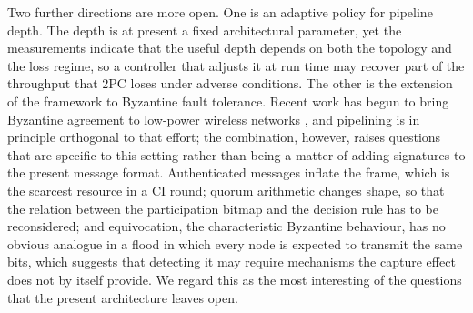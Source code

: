 \documentclass[journal]{IEEEtran}
\newcommand{\CI}{CI}                      %
\begin{document}
Two further directions are more open. One is an adaptive policy for
pipeline depth. The depth is at present a fixed architectural parameter,
yet the measurements indicate that the useful depth depends on both the
topology and the loss regime, so a controller that adjusts it at run time
may recover part of the throughput that 2PC loses under adverse
conditions. The other is the extension of the framework to Byzantine
fault tolerance. Recent work has begun to bring Byzantine agreement to
low-power wireless networks
\cite{goyal22reli,boehm24tinybft,liu25asyncbft}, and pipelining is in
principle orthogonal to that effort; the combination, however, raises
questions that are specific to this setting rather than being a matter of
adding signatures to the present message format. Authenticated messages
inflate the frame, which is the scarcest resource in a \CI{} round;
quorum arithmetic changes shape, so that the relation between the
participation bitmap and the decision rule has to be reconsidered; and
equivocation, the characteristic Byzantine behaviour, has no obvious
analogue in a flood in which every node is expected to transmit the same
bits, which suggests that detecting it may require mechanisms the capture
effect does not by itself provide. We regard this as the most interesting
of the questions that the present architecture leaves open.






\end{document}
